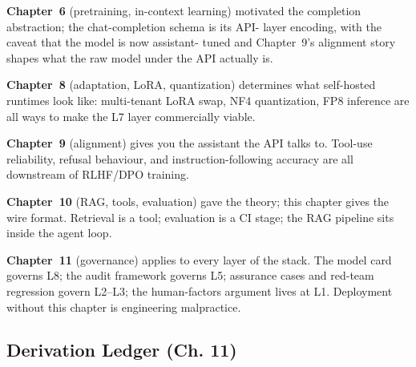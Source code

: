 \textbf{Chapter~6} (pretraining, in-context learning) motivated the
completion abstraction; the chat-completion schema is its API-
layer encoding, with the caveat that the model is now assistant-
tuned and Chapter~9's alignment story shapes what the raw model
under the API actually is.

\textbf{Chapter~8} (adaptation, LoRA, quantization) determines what
self-hosted runtimes look like: multi-tenant LoRA swap, NF4
quantization, FP8 inference are all ways to make the L7 layer
commercially viable.

\textbf{Chapter~9} (alignment) gives you the assistant the API
talks to. Tool-use reliability, refusal behaviour, and
instruction-following accuracy are all downstream of RLHF/DPO
training.

\textbf{Chapter~10} (RAG, tools, evaluation) gave the theory; this
chapter gives the wire format. Retrieval is a tool; evaluation
is a CI stage; the RAG pipeline sits inside the agent loop.

\textbf{Chapter~11} (governance) applies to every layer of the
stack. The model card governs L8; the audit framework governs
L5; assurance cases and red-team regression govern L2--L3; the
human-factors argument lives at L1. Deployment without this
chapter is engineering malpractice.

\subsection*{Derivation Ledger (Ch. 11)}

